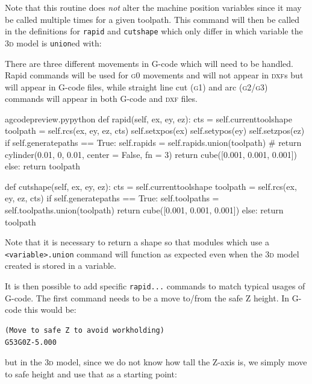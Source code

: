 \documentclass{ltxdoc}
\begin{document}
\noindent Note that this routine does \emph{not} alter the machine position variables since it may be called multiple times for a given toolpath. This command will then be called in the definitions for \verb|rapid| and \verb|cutshape| which only differ in which variable the \textsc{3d} model is \verb|union|ed with:

There are three different movements in G-code which will need to be handled. Rapid commands will be used for \textsc{g0} movements and will not appear in \textsc{dxf}s but will appear in G-code files, while straight line cut (\textsc{g1}) and arc (\textsc{g2/g3}) commands will appear in both G-code and \textsc{dxf} files. 

\lstset{firstnumber=\thegcpy}
\begin{writecode}{a}{gcodepreview.py}{python}
    def rapid(self, ex, ey, ez):
        cts = self.currenttoolshape
        toolpath = self.rcs(ex, ey, ez, cts)
        self.setxpos(ex)
        self.setypos(ey)
        self.setzpos(ez)
        if self.generatepaths == True:
            self.rapids = self.rapids.union(toolpath)
#            return cylinder(0.01, 0, 0.01, center = False, fn = 3)
            return cube([0.001, 0.001, 0.001])
        else:
            return toolpath

    def cutshape(self, ex, ey, ez):
        cts = self.currenttoolshape
        toolpath = self.rcs(ex, ey, ez, cts)
        if self.generatepaths == True:
            self.toolpaths = self.toolpaths.union(toolpath)
            return cube([0.001, 0.001, 0.001])
        else:
            return toolpath

\end{writecode}
\addtocounter{gcpy}{22}

Note that it is necessary to return a shape so that modules which use a \verb|<variable>.union| command will function as expected even when the \textsc{3d} model created is stored in a variable.

It is then possible to add specific \verb|rapid...| commands to match typical usages of G-code. The first command needs to be a move to/from the safe Z height. In G-code this would be:

\begin{verbatim}
(Move to safe Z to avoid workholding)
G53G0Z-5.000
\end{verbatim}

\noindent but in the \textsc{3d} model, since we do not know how tall the Z-axis is, we simply move to safe height and use that as a starting point:
\end{document}
